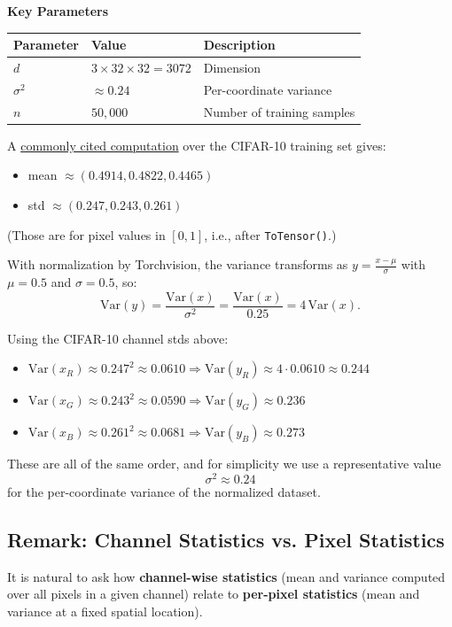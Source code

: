 \documentclass[11pt]{article}
\begin{document}
\textbf{Key Parameters}
\begin{table}[H]
\centering
\begin{tabular}{@{}lll@{}}
\toprule
Parameter & Value & Description \\ \midrule
$d$ & $3 \times 32 \times 32 = 3072$ & Dimension \\
$\sigma^2$ & $\approx 0.24$ & Per-coordinate variance \\
$n$ & $50{,}000$ & Number of training samples \\ \bottomrule
\end{tabular}
\end{table}

A \href{https://github.com/kuangliu/pytorch-cifar/issues/19}{commonly cited computation} over the CIFAR-10 training set gives:
\begin{itemize}
\item mean $\approx (0.4914, 0.4822, 0.4465)$
\item std $\approx (0.247, 0.243, 0.261)$
\end{itemize}

(Those are for pixel values in $[0,1]$, i.e., after \texttt{ToTensor()}.)

With normalization by Torchvision, the variance transforms as $y = \frac{x - \mu}{\sigma}$ with $\mu=0.5$ and $\sigma=0.5$, so:
\begin{equation}
\mathrm{Var}(y) = \frac{\mathrm{Var}(x)}{\sigma^2} = \frac{\mathrm{Var}(x)}{0.25} = 4\,\mathrm{Var}(x).
\end{equation}

Using the CIFAR-10 channel stds above:
\begin{itemize}
\item $\mathrm{Var}(x_R) \approx 0.247^2 \approx 0.0610 \Rightarrow \mathrm{Var}(y_R)\approx 4\cdot 0.0610 \approx 0.244$
\item $\mathrm{Var}(x_G) \approx 0.243^2 \approx 0.0590 \Rightarrow \mathrm{Var}(y_G)\approx 0.236$
\item $\mathrm{Var}(x_B) \approx 0.261^2 \approx 0.0681 \Rightarrow \mathrm{Var}(y_B)\approx 0.273$
\end{itemize}

These are all of the same order, and for simplicity we use a representative value
\begin{equation}
\sigma^2 \approx 0.24
\end{equation}
for the per-coordinate variance of the normalized dataset.

\subsection{Remark: Channel Statistics vs. Pixel Statistics}
It is natural to ask how \textbf{channel-wise statistics} (mean and variance computed over all pixels in a given channel) relate to \textbf{per-pixel statistics} (mean and variance at a fixed spatial location).
\end{document}
